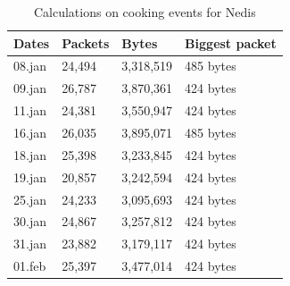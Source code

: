 \begin{table}[H]
\centering
    \caption{Calculations on cooking events for Nedis}
\label{tab:NedisCookingCalculations}
    \begin{tabular}{|l|l|l|l|}
        \hline
        \textbf{Dates}    & \textbf{Packets} & \textbf{Bytes}     & \textbf{Biggest packet} \\ \hline
        08.jan             & 24,494           & 3,318,519          & 485 bytes               \\ \hline
        09.jan             & 26,787           & 3,870,361          & 424 bytes               \\ \hline
        11.jan             & 24,381           & 3,550,947          & 424 bytes               \\ \hline
        16.jan             & 26,035           & 3,895,071          & 485 bytes               \\ \hline
        18.jan             & 25,398           & 3,233,845          & 424 bytes               \\ \hline
        19.jan             & 20,857           & 3,242,594          & 424 bytes               \\ \hline
        25.jan             & 24,233           & 3,095,693          & 424 bytes               \\ \hline
        30.jan             & 24,867           & 3,257,812          & 424 bytes               \\ \hline
        31.jan             & 23,882           & 3,179,117          & 424 bytes               \\ \hline
        01.feb             & 25,397           & 3,477,014          & 424 bytes               \\ \hline
    \end{tabular}
\end{table}

